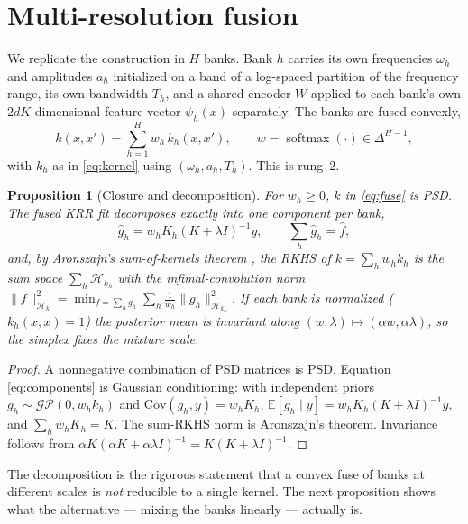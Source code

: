 \documentclass[11pt]{article}
\newtheorem{proposition}{Proposition}
\theoremstyle{definition}
\newcommand{\Hk}{\mathcal{H}}
\newcommand{\norm}[1]{\lVert #1 \rVert}
\newcommand{\E}{\mathbb{E}}
\DeclareMathOperator{\softmax}{softmax}
\begin{document}
\section{Multi-resolution fusion}\label{sec:fusion}
We replicate the construction in $H$ banks. Bank $h$ carries its own frequencies $\omega_h$ and
amplitudes $a_h$ initialized on a band of a log-spaced partition of the frequency range, its own
bandwidth $T_h$, and a shared encoder $W$ applied to each bank's own $2dK$-dimensional feature
vector $\psi_h(x)$ separately. The banks are fused convexly,
\begin{equation}
k(x,x')=\sum_{h=1}^H w_h\,k_h(x,x'),\qquad w=\softmax(\cdot)\in\Delta^{H-1},
\label{eq:fuse}
\end{equation}
with $k_h$ as in \eqref{eq:kernel} using $(\omega_h,a_h,T_h)$. This is rung~2.

\begin{proposition}[Closure and decomposition]\label{prop:fusion}
For $w_h\ge0$, $k$ in \eqref{eq:fuse} is PSD. The fused KRR fit decomposes exactly into one
component per bank,
\begin{equation}
\hat g_h=w_h K_h(K+\lambda I)^{-1}y,\qquad \textstyle\sum_h\hat g_h=\hat f,
\label{eq:components}
\end{equation}
and, by Aronszajn's sum-of-kernels theorem \citep{aronszajn1950,berlinet2004}, the RKHS of
$k=\sum_h w_h k_h$ is the sum space $\sum_h\Hk_{k_h}$ with the infimal-convolution norm
$\norm{f}_{\Hk_k}^2=\min_{f=\sum_h g_h}\sum_h\frac1{w_h}\norm{g_h}_{\Hk_{k_h}}^2$. If each bank
is normalized ($k_h(x,x)=1$) the posterior mean is invariant along $(w,\lambda)\mapsto(\alpha
w,\alpha\lambda)$, so the simplex fixes the mixture scale.
\end{proposition}
\begin{proof}
A nonnegative combination of PSD matrices is PSD. Equation \eqref{eq:components} is Gaussian
conditioning: with independent priors $g_h\sim\mathcal{GP}(0,w_h k_h)$ and $\mathrm{Cov}(g_h,y)=w_h
K_h$, $\E[g_h\mid y]=w_h K_h(K+\lambda I)^{-1}y$, and $\sum_h w_h K_h=K$. The sum-RKHS norm is
Aronszajn's theorem. Invariance follows from $\alpha K(\alpha K+\alpha\lambda I)^{-1}=K(K+\lambda
I)^{-1}$.
\end{proof}

The decomposition is the rigorous statement that a convex fuse of banks at different scales is
\emph{not} reducible to a single kernel. The next proposition shows what the alternative ---
mixing the banks linearly --- actually is.
\end{document}
